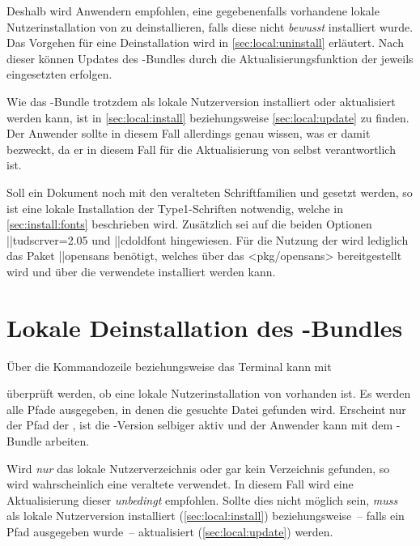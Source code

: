 Deshalb wird Anwendern empfohlen, eine gegebenenfalls vorhandene lokale 
Nutzerinstallation von \TUDScript zu deinstallieren, falls diese nicht 
\emph{bewusst} installiert wurde. Das Vorgehen für eine Deinstallation wird in 
\autoref{sec:local:uninstall} erläutert. Nach dieser können Updates des 
\TUDScript-Bundles durch die Aktualisierungsfunktion der jeweils eingesetzten 
\DistributionGeneral erfolgen. 

Wie das \TUDScript-Bundle trotzdem als lokale Nutzerversion installiert oder 
aktualisiert werden kann, ist in \autoref{sec:local:install} beziehungsweise 
\autoref{sec:local:update} zu finden. Der Anwender sollte in diesem Fall 
allerdings genau wissen, was er damit bezweckt, da er in diesem Fall für die 
Aktualisierung von \TUDScript selbst verantwortlich ist.

%
%
Soll ein Dokument noch mit den veralteten Schriftfamilien \Univers und \DIN 
gesetzt werden, so ist eine lokale Installation der Type1-Schriften notwendig, 
welche in \autoref{sec:install:fonts} beschrieben wird. Zusätzlich sei auf die 
beiden Optionen \Option||{tudscrver=2.05} und \Option||{cdoldfont} hingewiesen. 
Für die Nutzung der \OpenSans wird lediglich das Paket \Package||{opensans} 
benötigt, welches über das \CTAN<pkg/opensans> bereitgestellt wird und über die 
verwendete \DistributionGeneral installiert werden kann.



\section{%
  Lokale Deinstallation des \TUDScript-Bundles%
  \label{sec:local:uninstall}%
}
%
Über die Kommandozeile beziehungsweise das Terminal kann mit
%
\begin{quoting}
\end{quoting}
%
überprüft werden, ob eine lokale Nutzerinstallation von \TUDScript vorhanden 
ist. Es werden alle Pfade ausgegeben, in denen die gesuchte Datei gefunden 
wird. Erscheint nur der Pfad der \DistributionGeneral, ist die 
\TUDScript-Version selbiger aktiv und der Anwender kann mit dem 
\TUDScript-Bundle arbeiten.

Wird \emph{nur} das lokale Nutzerverzeichnis oder gar kein Verzeichnis 
gefunden, so wird wahrscheinlich eine veraltete \DistributionGeneral verwendet. 
In diesem Fall wird eine Aktualisierung dieser \emph{unbedingt} empfohlen. 
Sollte dies nicht möglich sein, \emph{muss} \TUDScript als lokale Nutzerversion 
installiert (\autoref{sec:local:install}) beziehungsweise~-- falls ein Pfad 
ausgegeben wurde~-- aktualisiert (\autoref{sec:local:update}) werden.

